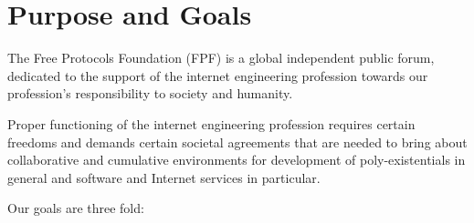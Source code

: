 \section*{Purpose and Goals}

\par 
The Free Protocols Foundation (FPF) is a global independent public forum,
dedicated to the support of the internet engineering profession towards 
our profession's responsibility to society and humanity.


\par 
Proper functioning of the internet engineering profession requires certain freedoms and
demands certain societal agreements that are needed to bring about collaborative and
cumulative environments for development of poly-existentials in general and software and
Internet services in particular.


\par Our goals are three fold:

